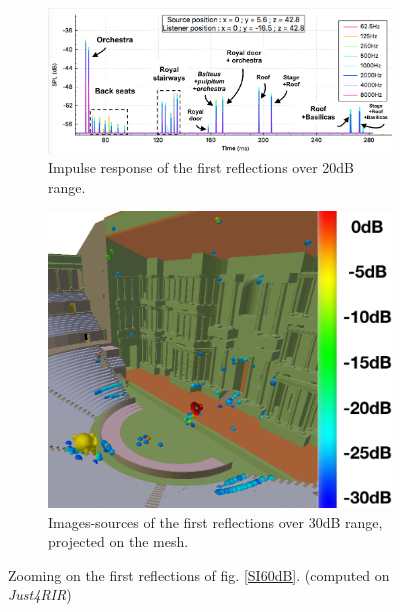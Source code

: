 \documentclass{aes2e}
\begin{document}
\begin{figure}[t]
\centering
	\begin{subfigure}{0.5\textwidth}
		\includegraphics[width=\linewidth]{rirTheatre20}
		\caption{Impulse response of the first reflections over 20dB range.}	
		\label{RIR20dB}
	\end{subfigure}
	\begin{subfigure}{0.35\textwidth}
		\includegraphics[width=\linewidth]{SI30dB}
		\caption{Images-sources of the first reflections over 30dB range, projected on the mesh.}
		\label{SI30dB}
	\end{subfigure}
	\caption{Zooming on the first reflections of fig. \ref{SI60dB}. (computed on \textit{Just4RIR})}
	\label{SItheater}
\end{figure}
\end{document}
